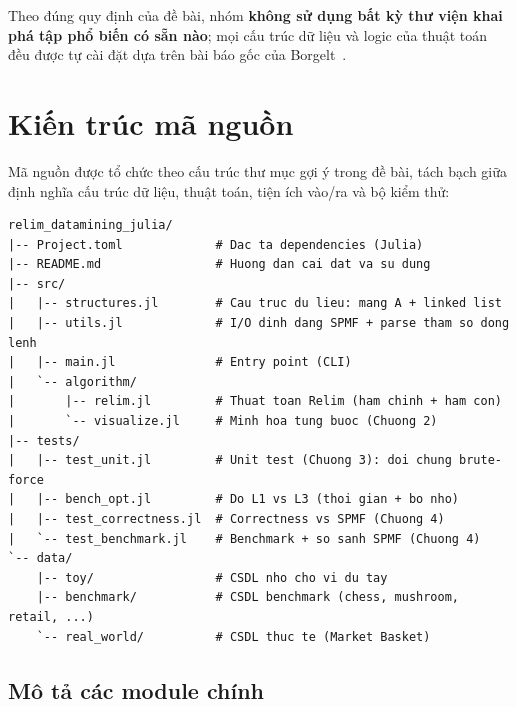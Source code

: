 \documentclass[12pt,a4paper]{report}
\begin{document}
Theo đúng quy định của đề bài, nhóm \textbf{không sử dụng bất kỳ thư viện khai
phá tập phổ biến có sẵn nào}; mọi cấu trúc dữ liệu và logic của thuật toán đều
được tự cài đặt dựa trên bài báo gốc của Borgelt~\cite{borgelt2005}.

\section{Kiến trúc mã nguồn}

Mã nguồn được tổ chức theo cấu trúc thư mục gợi ý trong đề bài, tách bạch giữa
định nghĩa cấu trúc dữ liệu, thuật toán, tiện ích vào/ra và bộ kiểm thử:

\begin{lstlisting}[style=julia, caption={Cấu trúc thư mục mã nguồn},
                   label={lst:tree}]
relim_datamining_julia/
|-- Project.toml             # Dac ta dependencies (Julia)
|-- README.md                # Huong dan cai dat va su dung
|-- src/
|   |-- structures.jl        # Cau truc du lieu: mang A + linked list
|   |-- utils.jl             # I/O dinh dang SPMF + parse tham so dong lenh
|   |-- main.jl              # Entry point (CLI)
|   `-- algorithm/
|       |-- relim.jl         # Thuat toan Relim (ham chinh + ham con)
|       `-- visualize.jl     # Minh hoa tung buoc (Chuong 2)
|-- tests/
|   |-- test_unit.jl         # Unit test (Chuong 3): doi chung brute-force
|   |-- bench_opt.jl         # Do L1 vs L3 (thoi gian + bo nho)
|   |-- test_correctness.jl  # Correctness vs SPMF (Chuong 4)
|   `-- test_benchmark.jl    # Benchmark + so sanh SPMF (Chuong 4)
`-- data/
    |-- toy/                 # CSDL nho cho vi du tay
    |-- benchmark/           # CSDL benchmark (chess, mushroom, retail, ...)
    `-- real_world/          # CSDL thuc te (Market Basket)
\end{lstlisting}

\subsection{Mô tả các module chính}
\end{document}
